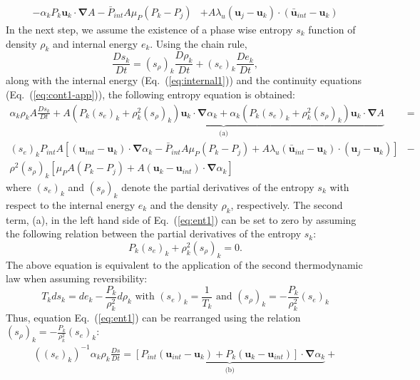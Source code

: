 \documentclass[preprint,10pt]{elsarticle}
\newcommand{\grad}{\mbold{\nabla}}
\newcommand{\mbold}[1]{\boldsymbol#1}
\newcommand{\eqt}[1]{Eq.~(\ref{#1})}                     %
\begin{document}
\begin{appendices}
\begin{align}
- \alpha_k P_k \mbold u_k \cdot \grad A 
 - \bar{P}_{int} A \mu_P \left(P_k-P_j \right) &+ A \lambda_u \left(\mbold u_j-\mbold u_k  \right) \cdot \left(\bar{\mbold u}_{int}-\mbold u_k \right)
\end{align}
In the next step, we assume the existence of a phase wise entropy $s_k$ function of density $\rho_k$ and internal energy $e_k$. Using the chain rule,
\begin{equation}
\frac{Ds_k}{Dt} = (s_\rho)_k \frac{D \rho_k}{Dt} + (s_e)_k \frac{De_k}{Dt},
\end{equation}
along with the internal energy (\eqt{eq:internal1}) and the continuity equations (\eqt{eq:cont1-app}), the following entropy equation is obtained:
\begin{eqnarray}
\label{eq:ent1}
\alpha_k \rho_k A \frac{Ds_k}{Dt} + \underbrace{A \left( P_k (s_e)_k + \rho_k^2 (s_\rho)_k \right)\mbold u_k \cdot \grad \alpha_k + \alpha_k \left( P_k (s_e)_k + \rho_k^2 (s_\rho)_k \right) \mbold u_k \cdot \grad A}_\textrm{(a)} &= \nonumber\\
(s_e)_k P_{int}A \left[ (\mbold u_{int}-\mbold u_k)\cdot \grad \alpha_k - \bar{P}_{int} A \mu_P (P_k-P_j) + A \lambda_u (\bar{\mbold u}_{int}-\mbold u_k) \cdot (\mbold u_j-\mbold u_k)\right] &- \nonumber\\
\rho^2 (s_\rho)_k \left[ \mu_P A (P_k-P_j) + A(\mbold u_k-\mbold u_{int}) \cdot \grad \alpha_k\right] & 
\end{eqnarray}
where $(s_e)_k$ and $(s_\rho)_k$ denote the partial derivatives of the entropy $s_k$ with respect to the internal energy $e_k$ and the density $\rho_k$, respectively.
The second term, (a), in the left hand side of \eqt{eq:ent1} can be set to zero by assuming the following relation between the partial derivatives of the entropy $s_k$:
\begin{equation}
\label{eq:ent2}
 P_k (s_e)_k + \rho_k^2 (s_\rho)_k = 0 .
\end{equation} 
The above equation is equivalent to the application of the second thermodynamic law when assuming reversibility:
\begin{equation}
T_k ds_k = de_k - \frac{P_k}{\rho_k^2} d \rho_k \text{ with } (s_e)_k = \frac{1}{T_k} \text{ and } (s_\rho)_k = - \frac{P_k}{\rho_k^2} (s_e)_k
\end{equation}
Thus, equation \eqt{eq:ent1} can be rearranged using the relation $(s_\rho)_k = - \frac{P_k}{\rho_k^2} (s_e)_k$:
\begin{eqnarray}
\label{eq:ent3}
((s_e)_k)^{-1} \alpha_k \rho_k \frac{Ds}{Dt} = \underbrace{\left[ P_{int} (\mbold u_{int}-\mbold u_k) + P_k (\mbold u_k-\mbold u_{int}) \right] \cdot \grad \alpha_k}_\textrm{(b)} + \nonumber\\ 

\end{eqnarray}
\end{appendices}
\end{document}
